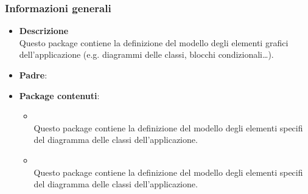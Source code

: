 \subsubsection{Informazioni generali}
\begin{figure}[h]
\centering
{}
\caption{}
\end{figure}
\FloatBarrier
\begin{itemize}
\item \textbf{Descrizione}\\
Questo package contiene la definizione del modello degli elementi grafici dell'applicazione (e.g. diagrammi delle classi, blocchi condizionali\dots). 
\item \textbf{Padre}: \hyperref[\nogloxy{swedesigner::client::model}]{}
\item \textbf{Package contenuti}:
\begin{itemize}
\item \hyperref[\nogloxy{swedesigner::client::model::celltypes::activity}]{}\\
Questo package contiene la definizione del modello degli elementi specifi del diagramma delle classi dell'applicazione.
\item \hyperref[\nogloxy{swedesigner::client::model::celltypes::class}]{}\\
Questo package contiene la definizione del modello degli elementi specifi del diagramma delle classi dell'applicazione.
\end{itemize}
\end{itemize}
